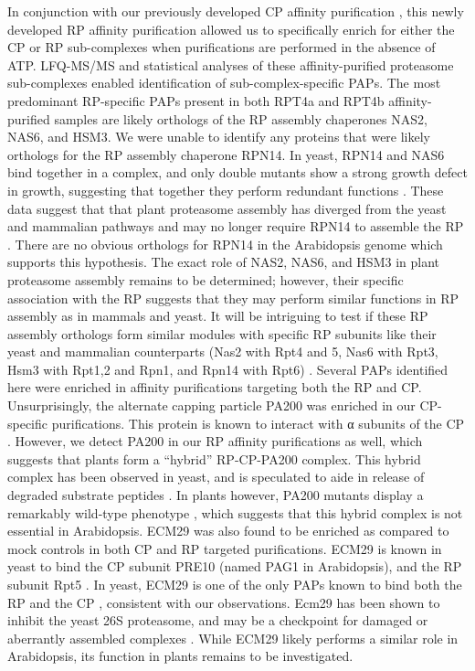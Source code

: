 In conjunction with our previously developed CP affinity purification \citep{book10}, this newly developed RP affinity purification allowed us to specifically enrich for either the CP or RP sub-complexes when purifications are performed in the absence of ATP. LFQ-MS/MS and statistical analyses of these affinity-purified proteasome sub-complexes enabled identification of sub-complex-specific PAPs. The most predominant RP-specific PAPs present in both RPT4a and RPT4b affinity-purified samples are likely orthologs of the RP assembly chaperones NAS2, NAS6, and HSM3. We were unable to identify any proteins that were likely orthologs for the RP assembly chaperone RPN14. In yeast, RPN14 and NAS6 bind together in a complex, and only double mutants show a strong growth defect in growth, suggesting that together they perform redundant functions \citep{funakoshi09}. These data suggest that that plant proteasome assembly has diverged from the yeast and mammalian pathways and may no longer require RPN14 to assemble the RP \citep{funakoshi09}. There are no obvious orthologs for RPN14 in the Arabidopsis genome \citep{book10} which supports this hypothesis. The exact role of NAS2, NAS6, and HSM3 in plant proteasome assembly remains to be determined; however, their specific association with the RP suggests that they may perform similar functions in RP assembly as in mammals and yeast. It will be intriguing to test if these RP assembly orthologs form similar modules with specific RP subunits like their yeast and mammalian counterparts (Nas2 with Rpt4 and 5, Nas6 with Rpt3, Hsm3 with Rpt1,2 and Rpn1, and Rpn14 with Rpt6) \citep{park10}.   
Several PAPs identified here were enriched in affinity purifications targeting both the RP and CP. Unsurprisingly, the alternate capping particle PA200 was enriched in our CP-specific purifications. This protein is known to interact with α subunits of the CP \citep{ortega05}. However, we detect PA200 in our RP affinity purifications as well, which suggests that plants form a “hybrid” RP-CP-PA200 complex. This hybrid complex has been observed in yeast, and is speculated to aide in release of degraded substrate peptides \citep{ortega05, schmidt05, ustrell02}. In plants however, PA200 mutants display a remarkably wild-type phenotype \citep{book10}, which suggests that this hybrid complex is not essential in Arabidopsis. ECM29 was also found to be enriched as compared to mock controls in both CP and RP targeted purifications. ECM29 is known in yeast to bind the CP subunit PRE10 (named PAG1 in Arabidopsis), and the RP subunit Rpt5 . In yeast, ECM29 is one of the only PAPs known to bind both the RP and the CP \citep{lehmann10}, consistent with our observations. Ecm29 has been shown to inhibit the yeast 26S proteasome, and may be a checkpoint for damaged or aberrantly assembled complexes \citep{lehmann10}. While ECM29 likely performs a similar role in Arabidopsis, its function in plants remains to be investigated.

